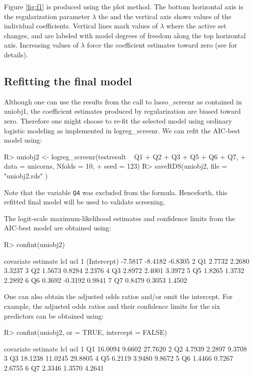 \documentclass[11pt]{report}
\renewenvironment{Schunk}{\vspace{\topsep}}{\vspace{\topsep}}
\begin{document}
Figure \ref{fig:f1} is produced using the \textsf{plot} method. The
bottom horizontal
axis is the regularization parameter $\lambda$ the and the vertical
axis shows values of the individual coefficients. Vertical lines mark
values of $\lambda$ where the active set changes, and are labeled with
model degrees of freedom along the top horizontal axis. Increasing values of
$\lambda$ force the coefficient estimates toward zero
(see \citep{Park+Hastie2007} for details).

\subsection*{Refitting the final model}

Although one can use the results from the call to \textsf{lasso\_screenr}
as contained in \textsf{uniobj1}, the coefficient estimates
produced by regularization are biased toward zero.  Therefore one
might choose to re-fit the selected model\citep{Hastie+al2009} using ordinary logistic
modeling\citep{Teferi+al2022} as implemented in \textsf{logreg\_screenr}.  We can refit the
AIC-best model using:
\begin{Schunk}
\begin{Sinput}
R> uniobj2 <- logreg_screenr(testresult ~ Q1 + Q2 + Q3 + Q5 + Q6 + Q7,
+                           data = unicorns, Nfolds = 10,
+                           seed = 123)
R> saveRDS(uniobj2, file = "uniobj2.rds" )
\end{Sinput}
\end{Schunk}
Note that the variable \verb|Q4| was excluded from the formula.
Henceforth, this refitted final model will be used to validate screening.

The logit-scale maximum-likelihood estimates and confidence limits
from the AIC-best model are obtained using:
\begin{Schunk}
\begin{Sinput}
R> confint(uniobj2)
\end{Sinput}
\begin{Soutput}
    covariate estimate     lcl     ucl
1 (Intercept)  -7.5817 -8.4182 -6.8305
2          Q1   2.7732  2.2680  3.3237
3          Q2   1.5673  0.8284  2.2376
4          Q3   2.8972  2.4001  3.3972
5          Q5   1.8265  1.3732  2.2892
6          Q6   0.3692 -0.3192  0.9841
7          Q7   0.8479  0.3053  1.4502
\end{Soutput}
\end{Schunk}
One can also obtain the adjusted odds ratios and/or omit the
intercept.  For example, the adjusted odds ratios and their confidence
limits for the six
predictors can be obtained using:
\begin{Schunk}
\begin{Sinput}
R> confint(uniobj2, or = TRUE, intercept = FALSE)
\end{Sinput}
\begin{Soutput}
  covariate estimate     lcl     ucl
1        Q1  16.0094  9.6602 27.7620
2        Q2   4.7939  2.2897  9.3708
3        Q3  18.1238 11.0245 29.8805
4        Q5   6.2119  3.9480  9.8672
5        Q6   1.4466  0.7267  2.6755
6        Q7   2.3346  1.3570  4.2641
\end{Soutput}
\end{Schunk}
\end{document}
